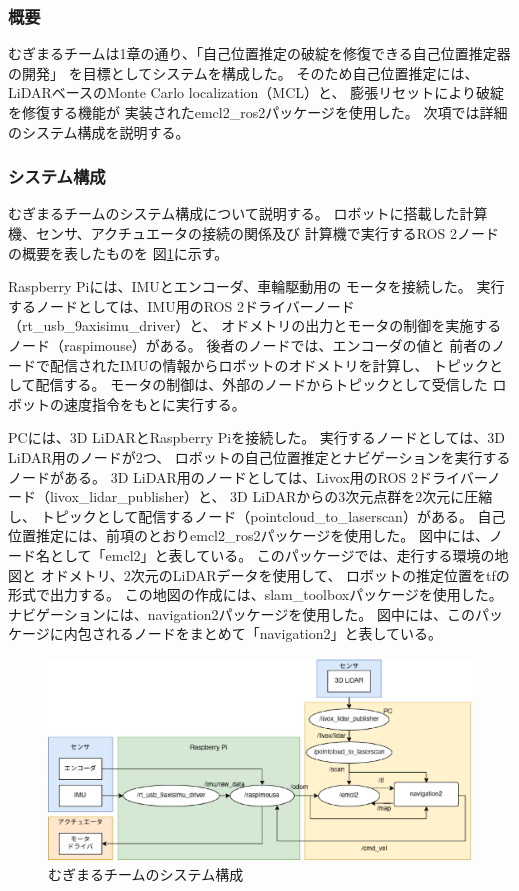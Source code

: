 \subsubsection{概要}
むぎまるチームは1章の通り、「自己位置推定の破綻を修復できる自己位置推定器の開発」
を目標としてシステムを構成した。
そのため自己位置推定には、LiDARベースのMonte Carlo localization（MCL）と、
膨張リセット\cite{ueda2004iros}により破綻を修復する機能が
実装されたemcl2\_ros2パッケージ\cite{emcl2_ros2}を使用した。
次項では詳細のシステム構成を説明する。
\subsubsection{システム構成}
むぎまるチームのシステム構成について説明する。
ロボットに搭載した計算機、センサ、アクチュエータの接続の関係及び
計算機で実行するROS 2ノードの概要を表したものを
図\ref{fig:mugimaru_system}に示す。

Raspberry Piには、IMUとエンコーダ、車輪駆動用の
モータを接続した。
実行するノードとしては、IMU用のROS 2ドライバーノード（rt\_usb\_9axisimu\_driver）と、
オドメトリの出力とモータの制御を実施するノード（raspimouse）がある。
後者のノードでは、エンコーダの値と
前者のノードで配信されたIMUの情報からロボットのオドメトリを計算し、
トピックとして配信する。
モータの制御は、外部のノードからトピックとして受信した
ロボットの速度指令をもとに実行する。

PCには、3D LiDARとRaspberry Piを接続した。
実行するノードとしては、3D LiDAR用のノードが2つ、
ロボットの自己位置推定とナビゲーションを実行するノードがある。
3D LiDAR用のノードとしては、Livox用のROS 2ドライバーノード（livox\_lidar\_publisher）と、
3D LiDARからの3次元点群を2次元に圧縮し、
トピックとして配信するノード（pointcloud\_to\_laserscan）がある。
自己位置推定には、前項のとおりemcl2\_ros2パッケージ\cite{emcl2_ros2}を使用した。
図中には、ノード名として「emcl2」と表している。
このパッケージでは、走行する環境の地図と
オドメトリ、2次元のLiDARデータを使用して、
ロボットの推定位置をtfの形式で出力する。
この地図の作成には、slam\_toolboxパッケージ\cite{slam_toolbox}を使用した。
ナビゲーションには、navigation2パッケージ\cite{nav2}を使用した。
図中には、このパッケージに内包されるノードをまとめて「navigation2」と表している。

\begin{figure}[h]
  \begin{center}
    \includegraphics[width=1.0\linewidth]{figs/mugimaru_system_2024.eps}
    \caption{むぎまるチームのシステム構成}
    \label{fig:mugimaru_system}
  \end{center}
\end{figure}


